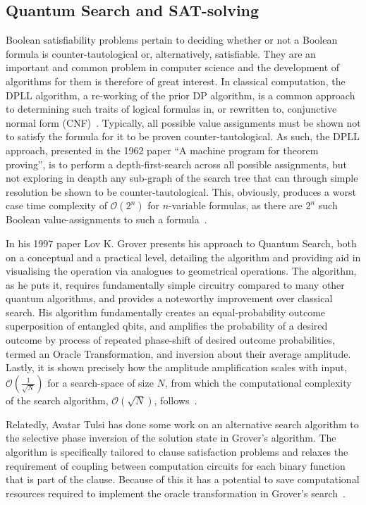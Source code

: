 \documentclass[msc,lith,english]{liuthesis}
\begin{document}
\subsection{Quantum Search and SAT-solving}
Boolean satisfiability problems pertain to deciding whether or not a Boolean formula is counter-tautological or, alternatively, satisfiable. They are an important and common problem in computer science and the development of algorithms for them is therefore of great interest. In classical computation, the DPLL algorithm, a re-working of the prior DP algorithm, is a common approach to determining such traits of logical formulas in, or rewritten to, conjunctive normal form (CNF)~\cite{QWSBA}. Typically, all possible value assignments must be shown not to satisfy the formula for it to be proven counter-tautological. As such, the DPLL approach, presented in the 1962 paper ``A machine program for theorem proving'', is to perform a depth-first-search across all possible assignments, but not exploring in deapth any sub-graph of the search tree that can through simple resolution be shown to be counter-tautological. This, obviously, produces a worst case time complexity of $\mathcal{O}(2^n)$ for $n$-variable formulas, as there are $2^n$ such Boolean value-assignments to such a formula~\cite{DPLL}.  

In his 1997 paper Lov K. Grover presents his approach to Quantum Search, both on a conceptual and a practical level, detailing the algorithm and providing aid in visualising the operation via analogues to geometrical operations. The algorithm, as he puts it, requires fundamentally simple circuitry compared to many other quantum algorithms, and provides a noteworthy improvement over classical search. His algorithm fundamentally creates an equal-probability outcome superposition of entangled qbits, and amplifies the probability of a desired outcome by process of repeated phase-shift of desired outcome probabilities, termed an Oracle Transformation, and inversion about their average amplitude. Lastly, it is shown precisely how the amplitude amplification scales with input, $\mathcal{O}(\frac{1}{\sqrt{N}})$ for a search-space of size $N$, from which the computational complexity of the search algorithm, $\mathcal{O}(\sqrt{N})$, follows~\cite{QMHSNH}.

Relatedly, Avatar Tulsi has done some work on an alternative search algorithm to the selective phase inversion of the solution state in Grover's algorithm. The algorithm is specifically tailored to clause satisfaction problems and relaxes the requirement of coupling between computation circuits for each binary function that is part of the clause. Because of this it has a potential to save computational resources required to implement the oracle transformation in Grover's search~\cite{QuantumCSPSearch}.
\end{document}
